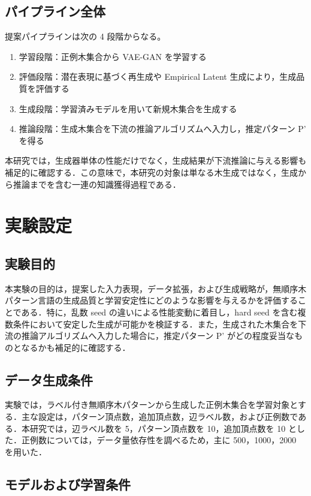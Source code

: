\documentclass[submit,techrep,noauthor]{ipsj}
\begin{document}
\subsection{パイプライン全体}

提案パイプラインは次の 4 段階からなる。
\begin{enumerate}
\item 学習段階：正例木集合から VAE-GAN を学習する
\item 評価段階：潜在表現に基づく再生成や Empirical Latent 生成により，生成品質を評価する
\item 生成段階：学習済みモデルを用いて新規木集合を生成する
\item 推論段階：生成木集合を下流の推論アルゴリズムへ入力し，推定パターン P' を得る
\end{enumerate}

本研究では，生成器単体の性能だけでなく，生成結果が下流推論に与える影響も補足的に確認する．この意味で，本研究の対象は単なる木生成ではなく，生成から推論までを含む一連の知識獲得過程である．

\section{実験設定}

\subsection{実験目的}

本実験の目的は，提案した入力表現，データ拡張，および生成戦略が，無順序木パターン言語の生成品質と学習安定性にどのような影響を与えるかを評価することである．特に，乱数 seed の違いによる性能変動に着目し，hard seed を含む複数条件において安定した生成が可能かを検証する．また，生成された木集合を下流の推論アルゴリズムへ入力した場合に，推定パターン P' がどの程度妥当なものとなるかも補足的に確認する．

\subsection{データ生成条件}

実験では，ラベル付き無順序木パターンから生成した正例木集合を学習対象とする．主な設定は，パターン頂点数，追加頂点数，辺ラベル数，および正例数である．本研究では，辺ラベル数を 5，パターン頂点数を 10，追加頂点数を 10 とした．正例数については，データ量依存性を調べるため，主に 500，1000，2000 を用いた．

\subsection{モデルおよび学習条件}
\end{document}
